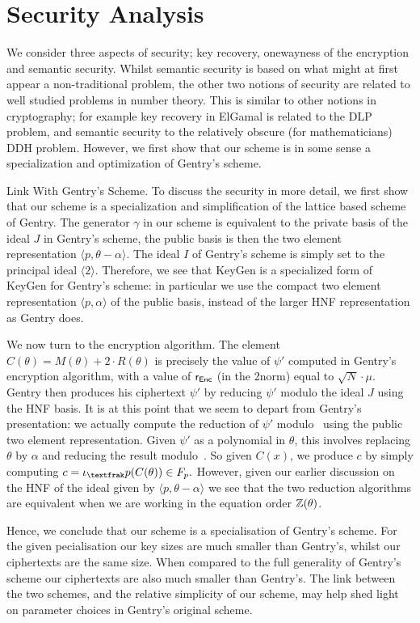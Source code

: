 

\section{Security Analysis}

We consider three aspects of security; key recovery, onewayness of the encryption and semantic security. 
Whilst semantic security is based on what might at first appear a non-traditional problem, the other two notions of security are related to well studied problems in number theory. 
This is similar to other notions in cryptography; for example key recovery in ElGamal is related to the DLP problem, and semantic security to the relatively obscure (for mathematicians) DDH problem. 
However, we first show that our scheme is in some sense a specialization and optimization of Gentry's scheme.

\begin{bparagraph}{Link With Gentry's Scheme.}
	To discuss the security in more detail, we first show that our scheme is a specialization and simplification of the lattice based scheme of Gentry. 
	The generator $\gamma$ in our scheme is  equivalent to the private basis of the ideal $J$ in Gentry's scheme, the public basis is then the two element  representation $\langle p, \theta - \alpha \rangle$. 
	The ideal $I$ of Gentry's scheme is simply set to the principal ideal $\langle 2 \rangle$.
	Therefore, we see that KeyGen is a specialized form of KeyGen for Gentry's scheme: in particular we use the compact two element representation $\langle p, \alpha \rangle$ of the public basis, instead of the larger HNF  representation as Gentry does.
	
	We now turn to the encryption algorithm. 
	The element $C(\theta) = M(\theta) + 2 \cdot R(\theta)$ is precisely the value of $\psi '$ computed in Gentry's encryption algorithm, with a value of $\textsf{r}_{\textsf{Enc}}$ (in the 2\ndash norm) equal to $\sqrt{N} \cdot \mu$.
	Gentry then produces his ciphertext	$\psi '$ by reducing $\psi '$ modulo the ideal $J$ using the HNF basis.
	It is at this point	that we seem to depart from Gentry's presentation: we actually compute the reduction of $\psi '$ modulo~ using the public two element representation.
	Given $\psi '$ as a polynomial in $\theta$, this involves replacing $\theta$ by $\alpha$ and reducing the result modulo~. So given $C(x)$, we produce $c$ by simply computing $c = \iota_\tfr{p}(C(\theta)) \in F_p.$
	However, given our earlier discussion on the HNF of the ideal given by $\langle p, \theta - \alpha \rangle$	we see that the two reduction algorithms are equivalent when we are working in	the equation order $\mathbb{Z}(\theta)$.
	
	Hence, we conclude that our scheme is a specialisation of Gentry's scheme. 
	For the given pecialisation our key sizes are much smaller than Gentry's, whilst our ciphertexts are the same size.
	When compared to the full generality of Gentry's scheme our ciphertexts are also much smaller than Gentry's. 
	The link between the two schemes, and the relative simplicity of our scheme, may help shed light on parameter choices in Gentry's original scheme.
\end{bparagraph}

